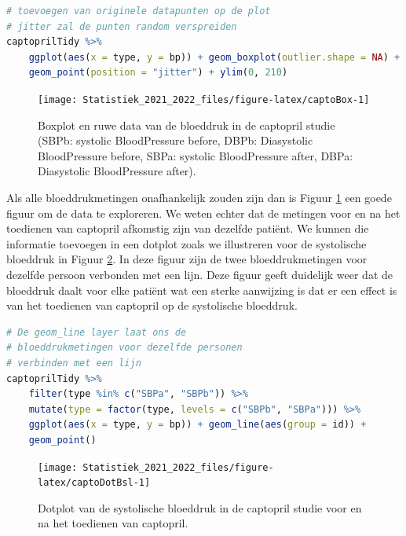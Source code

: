 \documentclass[
  12pt,dutch,coursenotes]{book}
\theoremstyle{definition}
\theoremstyle{definition}
\theoremstyle{definition}
\theoremstyle{definition}
\theoremstyle{remark}
\begin{document}
\begin{lstlisting}[language=R]
# toevoegen van originele datapunten op de plot
# jitter zal de punten random verspreiden
captoprilTidy %>%
    ggplot(aes(x = type, y = bp)) + geom_boxplot(outlier.shape = NA) +
    geom_point(position = "jitter") + ylim(0, 210)
\end{lstlisting}

\begin{figure}

{\centering \texttt{[image: Statistiek\_2021\_2022\_files/figure-latex/captoBox-1]} 

}

\caption{Boxplot en ruwe data van de bloeddruk in de captopril studie (SBPb: systolic BloodPressure before, DBPb: Diasystolic BloodPressure before, SBPa: systolic BloodPressure after, DBPa: Diasystolic BloodPressure after).}\label{fig:captoBox}
\end{figure}

Als alle bloeddrukmetingen onafhankelijk zouden zijn dan is Figuur \ref{fig:captoBox} een goede figuur om de data te exploreren.
We weten echter dat de metingen voor en na het toedienen van captopril afkomstig zijn van dezelfde patiënt.
We kunnen die informatie toevoegen in een dotplot zoals we illustreren voor de systolische bloeddruk in Figuur \ref{fig:captoDotBsl}.
In deze figuur zijn de twee bloeddrukmetingen voor dezelfde persoon verbonden met een lijn.
Deze figuur geeft duidelijk weer dat de bloeddruk daalt voor elke patiënt wat een sterke aanwijzing is dat er een effect is van het toedienen van captopril op de systolische bloeddruk.

\begin{lstlisting}[language=R]
# De geom_line layer laat ons de
# bloeddrukmetingen voor dezelfde personen
# verbinden met een lijn
captoprilTidy %>%
    filter(type %in% c("SBPa", "SBPb")) %>%
    mutate(type = factor(type, levels = c("SBPb", "SBPa"))) %>%
    ggplot(aes(x = type, y = bp)) + geom_line(aes(group = id)) +
    geom_point()
\end{lstlisting}

\begin{figure}

{\centering \texttt{[image: Statistiek\_2021\_2022\_files/figure-latex/captoDotBsl-1]} 

}

\caption{Dotplot van de systolische bloeddruk in de captopril studie voor en na het toedienen van captopril.}\label{fig:captoDotBsl}
\end{figure}
\end{document}
